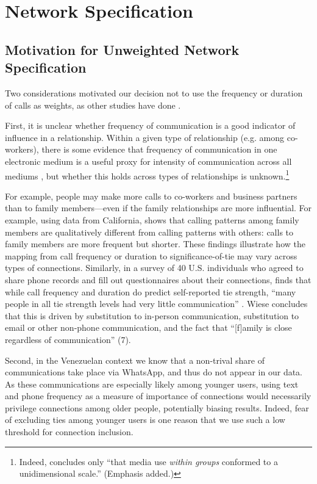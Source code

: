 \documentclass[12pt]{article}
\begin{document}
\section{Network Specification}\label{appendix_thresholding}


\subsection{Motivation for Unweighted Network Specification}

Two considerations motivated our decision not to use the frequency or duration of calls as weights, as other studies have done \citep{Onnela:2007eka,Miritello:2013bl}.

First, it is unclear whether frequency of communication is a good indicator of influence in a relationship. Within a given type of relationship (e.g. among co-workers), there is some evidence that frequency of communication in one electronic medium is a useful proxy for intensity of communication across all mediums \citep{Haythornthwaite:2005bi}, but whether this holds across types of relationships is unknown.\footnote{Indeed, \cite[p. 125]{Haythornthwaite:2005bi} concludes only ``that media use \emph{within groups} conformed to a unidimensional scale.'' (Emphasis added.)}

For example, people may make more calls to co-workers and business partners than to family members---even if the family relationships are more influential. For example, using data from California, \cite{Motahari:2012tr} shows that calling patterns among family members are qualitatively different from calling patterns with others: calls to family members are more frequent but shorter. These findings illustrate how the mapping from call frequency or duration to significance-of-tie may vary across types of connections. Similarly, in a survey of 40 U.S. individuals who agreed to share phone records and fill out questionnaires about their connections, \cite{Wiese:2015bd} finds that while call frequency and duration do predict self-reported tie strength, ``many people in all tie strength levels had very little communication'' \citep[5]{Wiese:2015bd}.  Wiese concludes that this is driven by substitution to in-person communication, substitution to email or other non-phone communication, and the fact that ``[f]amily is close regardless of communication'' (7).

Second, in the Venezuelan context we know that a non-trival share of communications take place via WhatsApp, and thus do not appear in our data. As these communications are especially likely among younger users, using text and phone frequency as a measure of importance of connections would necessarily privilege connections among older people, potentially biasing results. Indeed, fear of excluding ties among younger users is one reason that we use such a low threshold for connection inclusion.
\end{document}
